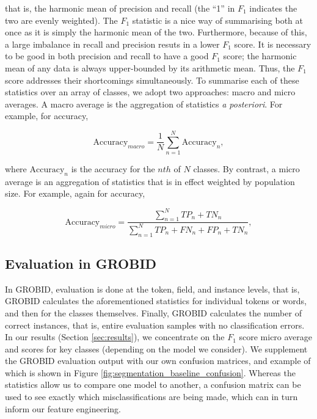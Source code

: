 that is, the harmonic mean of precision and recall (the ``1'' in $F_1$ indicates the two are evenly weighted). The $F_1$ statistic is a nice way of summarising both at once as it is simply the harmonic mean of the two. Furthermore, because of this, a large imbalance in recall and precision resuts in a lower $F_1$ score. It is necessary to be good in both precision and recall to have a good $F_1$ score; the harmonic mean of any data is always upper-bounded by its arithmetic mean. Thus, the $F_1$ score addresses their shortcomings simultaneously. To summarise each of these statistics over an array of classes, we adopt two approaches: macro and micro averages. A macro average is the aggregation of statistics \emph{a posteriori}. For example, for accuracy,

\begin{equation}
\text{Accuracy}_{macro} = \frac{1}{N}\sum_{n=1}^{N}\text{Accuracy}_n,
\label{eq:macroaccuracy}
\end{equation}

where $\text{Accuracy}_n$ is the accuracy for the $nth$ of $N$ classes. By contrast, a micro average is an aggregation of statistics that is in effect weighted by population size. For example, again for accuracy,

\begin{equation}
\text{Accuracy}_{micro} = \frac{\sum_{n=1}^N TP_n + TN_n}{\sum_{n=1}^N TP_n + FN_n + FP_n + TN_n},
\label{eq:microaccuracy}
\end{equation}

\subsection{Evaluation in GROBID}

In GROBID, evaluation is done at the token, field, and instance levels, that is, GROBID calculates the aforementioned statistics for individual tokens or words, and then for the classes themselves. Finally, GROBID calculates the number of correct instances, that is, entire evaluation samples with no classification errors. In our results (Section \ref{sec:results}), we concentrate on the $F_1$ score micro average and scores for key classes (depending on the model we consider). We supplement the GROBID evaluation output with our own confusion matrices, and example of which is shown in Figure \ref{fig:segmentation_baseline_confusion}. Whereas the statistics allow us to compare one model to another, a confusion matrix can be used to see exactly which misclassifications are being made, which can in turn inform our feature engineering.

